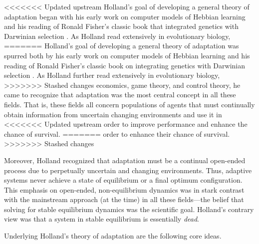 \documentclass{sig-alternate}
\begin{document}
<<<<<<< Updated upstream
Holland's goal of developing a general theory of adaptation 
began with his early work on computer models of Hebbian learning
\cite{Rochester1956} and his reading of Ronald Fisher's classic book
that integrated genetics with Darwinian selection \cite{Fisher1930}.
As Holland read extensively in evolutionary biology,
=======
Holland's goal of developing a general theory of adaptation was
spurred both by his early work on computer models of Hebbian learning
\cite{Rochester1956} and his reading of Ronald Fisher's classic book
on integrating genetics with Darwinian selection \cite{Fisher1930}.
As Holland further read extensively in evolutionary biology,
>>>>>>> Stashed changes
economics, game theory, and control theory, he came to recognize that
adaptation was the most central concept in all these fields.  That is,
these fields all concern populations of agents that must continually
obtain information from uncertain changing environments and use it in
<<<<<<< Updated upstream
order to improve performance and enhance the chance of survival. 
=======
order to enhance their chance of survival. 
>>>>>>> Stashed changes

Moreover, Holland recognized that adaptation must be a continual
open-ended process due to perpetually uncertain and changing
environments.  Thus, adaptive systems never achieve a state of
equilibrium or a final optimum configuration.  This emphasis on
open-ended, non-equilibrium dynamics was in stark contrast with the
mainstream approach (at the time) in all these fields---the belief
that solving for stable equilibrium dynamics was the scientific goal.
Holland's contrary view was that a system in stable equilibrium is
essentially \emph{dead}.

Underlying Holland's theory of adaptation are the following core ideas.  
\end{document}
